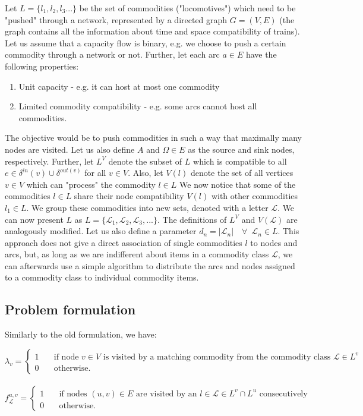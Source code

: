 Let $L = \{l_1, l_2, l_3 ... \}$ be the set of commodities ("locomotives") which need to be "pushed" through a network, represented by a directed graph $G = (V, E)$ (the graph contains all the information about time and space compatibility of trains). 
Let us assume that a capacity flow is binary, e.g. we choose to push a certain commodity through a network or not.
Further, let each arc $a \in E$ have the following properties:
\begin{enumerate}
    \item Unit capacity - e.g. it can host at most one commodity
    \item Limited commodity compatibility - e.g. some arcs cannot host all commodities.
\end{enumerate}
The objective would be to push commodities in such a way that maximally many nodes are visited.
Let us also define $A$ and $\Omega \in E$ as the source and sink nodes, respectively. Further, let $L^V$ denote the subset of $L$ which is compatible to all $e \in \delta^{in}(v) \cup \delta^{out(v)}$ for all $v \in V$. Also, let $V(l)$ denote the set of all vertices $v \in V$ which can "process" the commodity $l \in L$
\newline
\newline
\noindent
We now notice that some of the commodities $l \in L$ share their node compatibility $V(l)$ with other commodities $l_1 \in L$. 
We group these commodities into new sets, denoted with a letter $\mathscr{L}$. 
We can now present $L$ as $L = \{\mathscr{L}_1, \mathscr{L}_2, \mathscr{L}_3, ...\}$. The definitions of $L^V$ and $V(\mathscr{L})$ are analogously modified. Let us also define a parameter $d_n = |\mathscr{L}_n| \quad \forall \enspace \mathscr{L}_n \in L$.
This approach does not give a direct association of single commodities $l$ to nodes and arcs, but, as long as we are indifferent about items in a commodity class $\mathscr{L}$, we can afterwards use a simple algorithm to distribute the arcs and nodes assigned to a commodity class to individual commodity items.
\subsection{Problem formulation}
Similarly to the old formulation, we have:

$\lambda_v = \begin{cases}
    1  & \quad \text{if node } v \in V \text{ is visited by a matching commodity from the commodity class } \mathscr{L} \in L^v \\
    0  & \quad \text{otherwise.}
  \end{cases}$
\\
\\
$f^{u, v}_\mathscr{L} = \begin{cases}
    1  & \quad \text{if nodes } (u, v) \in E \text{ are visited by an } l \in \mathscr{L} \in L^v \cap L^u \text{ consecutively} \\
    0  & \quad \text{otherwise.}
  \end{cases}$ 
\newline

